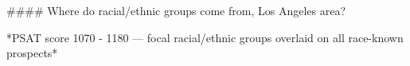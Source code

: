 #### Where do racial/ethnic groups come from, Los Angeles area?

*PSAT score 1070 - 1180 — focal racial/ethnic groups overlaid on all race-known prospects*
